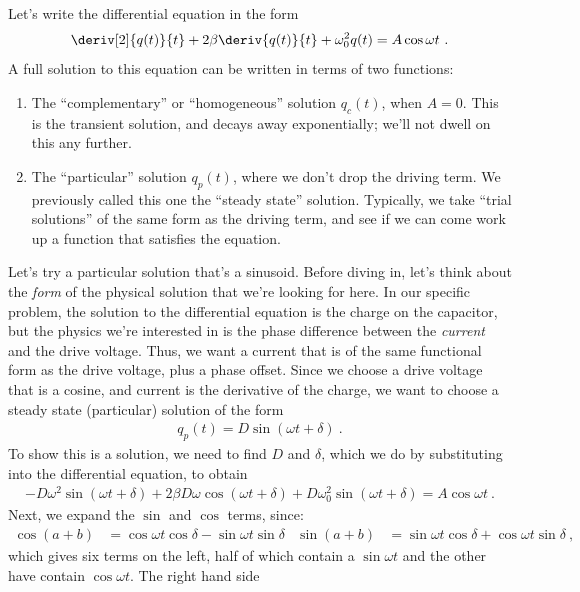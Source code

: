 \documentclass[12pt]{article}
\begin{document}
Let's write the differential equation in the form
\begin{gather*}
  \deriv[2]{q(t)}{t} + 2 \beta \deriv{q(t)}{t} + \omega_0^2 q(t) = A
  \cos\omega t\ .
\end{gather*}
A full solution to this equation can be written in terms of two
functions: 
 \begin{enumerate}
\item The ``complementary'' or ``homogeneous'' solution $q_c(t)$, when
  $A=0$.  This is the transient solution, and decays away
  exponentially; we'll not dwell on this any further.
\item The ``particular'' solution $q_p(t)$, where we don't drop the
  driving term.  We previously called this one the ``steady state''
  solution.  Typically, we take ``trial solutions'' of the same form
  as the driving term, and see if we can come work up a function that
  satisfies the equation.
\end{enumerate}
Let's try a particular solution that's a sinusoid.  Before diving in,
let's think about the \textit{form} of the physical solution that
we're looking for here.  In our specific problem, the solution to the
differential equation is the charge on the capacitor, but the physics
we're interested in is the phase difference between the
\textit{current} and the drive voltage.  Thus, we want a current that
is of the same functional form as the drive voltage, plus a phase
offset.  Since we choose a drive voltage that is a cosine, and current
is the derivative of the charge, we want to choose a steady state
(particular) solution of the form
\begin{gather*}
  q_p(t) = D \sin\left( \omega t + \delta \right)\ .
\end{gather*}
To show this is a solution, we need to find $D$ and $\delta$, which we
do by substituting into the differential equation, to obtain
\begin{gather*}
  -D\omega^2 \sin\left(\omega t + \delta\right) + 2\beta D\omega
  \cos\left(\omega t + \delta\right) + D\omega_0^2 \sin\left(\omega t
    + \delta\right) = A \cos\omega t\ .
\end{gather*}
Next, we expand the $\sin$ and $\cos$ terms, since:
\begin{align*}
  \cos(a+b) &= \cos\omega t \cos\delta - \sin\omega t \sin\delta &
  \sin(a+b) &= \sin\omega t \cos\delta + \cos\omega t \sin\delta\ ,
\end{align*}
which gives six terms on the left, half of which contain a $\sin\omega
t$ and the other have contain $\cos\omega t$.  The right hand side
\end{document}
